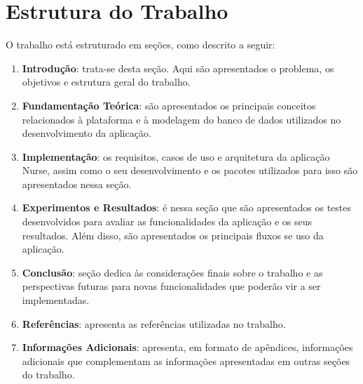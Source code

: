 \section{Estrutura do Trabalho}
\label{cap1:Sec:EstruturaTrabalho}

O trabalho está estruturado em seções, como descrito a seguir: 


  \begin{enumerate}[label=\textbf{Seção \arabic*}]
    \item \textbf{Introdução}: trata-se desta seção. Aqui são apresentados o problema, os objetivos e estrutura geral do trabalho.
    \item \textbf{Fundamentação Teórica}: são apresentados os principais conceitos relacionados à plataforma e à modelagem do banco de dados utilizados no desenvolvimento da aplicação.
    \item \textbf{Implementação}: os requisitos, casos de uso e arquitetura da aplicação Nurse, assim como o seu desenvolvimento e os pacotes utilizados para isso são apresentados nessa seção.
    \item \textbf{Experimentos e Resultados}: é nessa seção que são apresentados os testes desenvolvidos para avaliar as funcionalidades da aplicação e os seus resultados. Além disso, são apresentados os principais fluxos se uso da aplicação.
    \item \textbf{Conclusão}: seção dedica às considerações finais sobre o trabalho e as perspectivas futuras para novas funcionalidades que poderão vir a ser implementadas.
    \item \textbf{Referências}: apresenta as referências utilizadas no trabalho.
    \item \textbf{Informações Adicionais}: apresenta, em formato de apêndices, informações adicionais que complementam as informações apresentadas em outras seções do trabalho.
  \end{enumerate}



